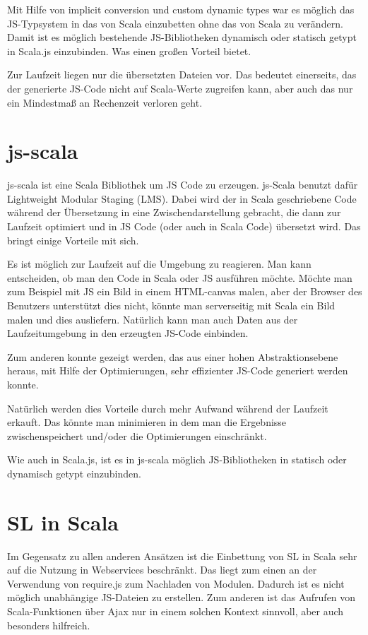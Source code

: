 \documentclass[12pt,bibtotoc]{scrreprt}
\begin{document}
Mit Hilfe von implicit conversion und custom dynamic types war es möglich das JS-Typsystem in das von Scala einzubetten ohne das von Scala zu verändern. Damit ist es möglich bestehende JS-Bibliotheken dynamisch oder statisch getypt in Scala.js einzubinden. Was einen großen Vorteil bietet. 

Zur Laufzeit liegen nur die übersetzten Dateien vor. Das bedeutet einerseits, das der generierte JS-Code nicht auf Scala-Werte zugreifen kann, aber auch das nur ein Mindestmaß an Rechenzeit verloren geht.

\section{js-scala}

js-scala ist eine Scala Bibliothek um JS Code zu erzeugen\cite{Kossakowski2012}. js-Scala benutzt dafür Lightweight Modular Staging (LMS)\cite{Rompf2010}. Dabei wird der in Scala geschriebene Code während der Übersetzung in eine Zwischendarstellung gebracht, die dann zur Laufzeit optimiert und in JS Code (oder auch in Scala Code) übersetzt wird. Das bringt einige Vorteile mit sich. 

Es ist möglich zur Laufzeit auf die Umgebung zu reagieren. Man kann entscheiden, ob man den Code in Scala oder JS ausführen möchte. Möchte man zum Beispiel mit JS ein Bild in einem HTML-canvas malen, aber der Browser des Benutzers unterstützt dies nicht, könnte man serverseitig mit Scala ein Bild malen und dies ausliefern. Natürlich kann man auch Daten aus der Laufzeitumgebung in den erzeugten JS-Code einbinden.

Zum anderen konnte gezeigt werden, das aus einer hohen Abstraktionsebene heraus, mit Hilfe der Optimierungen, sehr effizienter JS-Code generiert werden konnte\cite{Richard-Foy2013}.

Natürlich werden dies Vorteile durch mehr Aufwand während der Laufzeit erkauft. Das könnte man minimieren in dem man die Ergebnisse zwischenspeichert und/oder die Optimierungen einschränkt.

Wie auch in Scala.js, ist es in js-scala möglich JS-Bibliotheken in statisch oder dynamisch getypt einzubinden.

\section{SL in Scala}

Im Gegensatz zu allen anderen Ansätzen ist die Einbettung von SL in Scala sehr auf die Nutzung in Webservices beschränkt. Das liegt zum einen an der Verwendung von require.js zum Nachladen von Modulen. Dadurch ist es nicht möglich unabhängige JS-Dateien zu erstellen. Zum anderen ist das Aufrufen von Scala-Funktionen über Ajax nur in einem solchen Kontext sinnvoll, aber auch besonders hilfreich.
\end{document}
